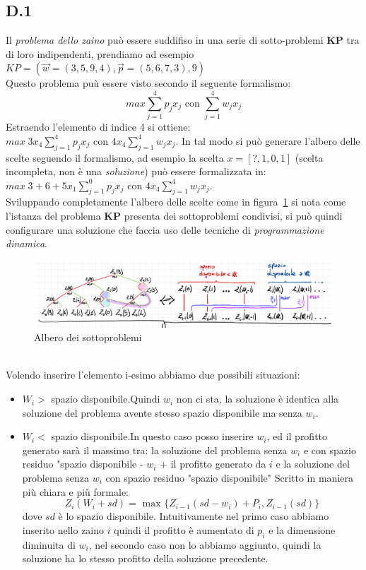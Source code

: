 \documentclass[a4paper]{article}
\begin{document}
\subsection{D.1}
Il \textit{problema dello zaino} può essere suddifiso in una serie di sotto-problemi \textbf{KP} tra di loro indipendenti, prendiamo ad esempio $KP = (\vec w = (3,5,9,4), \vec p = (5, 6, 7, 3),9)$\\
Questo problema puù essere visto secondo il seguente formalismo:$$ max \sum_{j=1}^4 p_jx_j \text{ con } \sum_{j=1}^4 w_jx_j$$
Estraendo l'elemento di indice 4 si ottiene: $ max\; 3x_4 \sum_{j=1}^4 p_jx_j \text{ con } 4x_4\sum_{j=1}^4 w_jx_j$.
In tal modo si può generare l'albero delle scelte seguendo il formalismo, ad esempio la scelta $x=[?,1, 0 ,1]$ (scelta incompleta, non è una \textit{soluzione}) può essere formalizzata in:
$max\; 3 + 6 +5x_1 \sum_{j=1}^0 p_jx_j \text{ con } 4x_4\sum_{j=1}^4 w_jx_j$.\\
Sviluppando completamente l'albero delle scelte come in figura~\ref{FIG:D1_albero} si nota come l'istanza del problema \textbf{KP} presenta dei sottoproblemi condivisi, si può quindi configurare una soluzione che faccia uso delle tecniche di \textit{programmazione dinamica}.
\begin{figure}[!ht]
\centering
\includegraphics[width=1\textwidth]{./img/D1_albero}
\caption{Albero dei sottoproblemi} \label{FIG:D1_albero}
\end{figure}\\
Volendo inserire l'elemento i-esimo abbiamo due possibili situazioni:
\begin{itemize}
	\item$W_i >$ spazio disponibile.Quindi $w_i$ non ci sta, la soluzione è identica alla soluzione del problema avente stesso spazio disponibile ma senza $w_i$.
	\item$W_i <$ spazio disponibile.In questo caso posso inserire $w_i$, ed il profitto generato sarà il massimo tra: la soluzione del problema senza $w_i$ e con spazio residuo "spazio disponibile - $w_i$ + il profitto generato da $i$ e la soluzione del problema senza $w_i$ con spazio residuo "spazio disponibile"
		Scritto in maniera più chiara e più formale: $$Z_i(W_i + sd)= \text{ max } \{ Z_{i-1}(sd - w_i) + P_i , Z_{i-1}(sd) \}$$ dove $sd$ è lo spazio disponibile.
		Intuitivamente nel primo caso abbiamo inserito nello zaino $i$ quindi il profitto è aumentato di $p_i$ e la dimensione diminuita di $w_i$, nel secondo caso non lo abbiamo aggiunto, quindi la soluzione ha lo stesso profitto della soluzione precedente.
\end{itemize}
\end{document}
